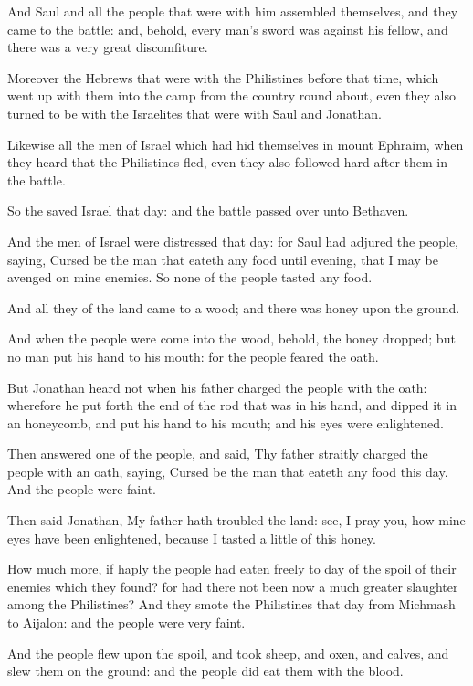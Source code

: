 \verse And Saul and all the people that were with him assembled themselves, and they came to the battle: and, behold, every man's sword was against his fellow, and there was a very great discomfiture.

\verse Moreover the Hebrews that were with the Philistines before that time, which went up with them into the camp from the country round about, even they also turned to be with the Israelites that were with Saul and Jonathan.

\verse Likewise all the men of Israel which had hid themselves in mount Ephraim, when they heard that the Philistines fled, even they also followed hard after them in the battle.

\verse So the \LORD saved Israel that day: and the battle passed over unto Bethaven.

\verse And the men of Israel were distressed that day: for Saul had adjured the people, saying, Cursed be the man that eateth any food until evening, that I may be avenged on mine enemies. So none of the people tasted any food.

\verse And all they of the land came to a wood; and there was honey upon the ground.

\verse And when the people were come into the wood, behold, the honey dropped; but no man put his hand to his mouth: for the people feared the oath.

\verse But Jonathan heard not when his father charged the people with the oath: wherefore he put forth the end of the rod that was in his hand, and dipped it in an honeycomb, and put his hand to his mouth; and his eyes were enlightened.

\verse Then answered one of the people, and said, Thy father straitly charged the people with an oath, saying, Cursed be the man that eateth any food this day. And the people were faint.

\verse Then said Jonathan, My father hath troubled the land: see, I pray you, how mine eyes have been enlightened, because I tasted a little of this honey.

\verse How much more, if haply the people had eaten freely to day of the spoil of their enemies which they found? for had there not been now a much greater slaughter among the Philistines?  \verse And they smote the Philistines that day from Michmash to Aijalon: and the people were very faint.

\verse And the people flew upon the spoil, and took sheep, and oxen, and calves, and slew them on the ground: and the people did eat them with the blood.

